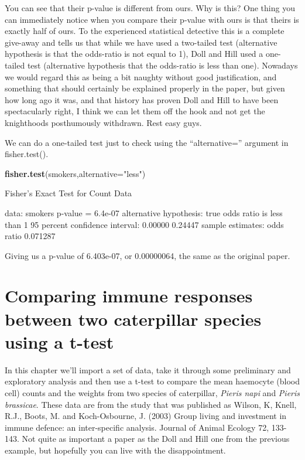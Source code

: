 \documentclass[
]{book}
\newenvironment{Shaded}{\begin{snugshade}}{\end{snugshade}}
\newcommand{\DataTypeTok}[1]{\textcolor[rgb]{0.13,0.29,0.53}{#1}}
\newcommand{\KeywordTok}[1]{\textcolor[rgb]{0.13,0.29,0.53}{\textbf{#1}}}
\newcommand{\NormalTok}[1]{#1}
\newcommand{\StringTok}[1]{\textcolor[rgb]{0.31,0.60,0.02}{#1}}
\begin{document}
You can see that their p-value is different from ours. Why is this? One thing you can immediately notice when you compare their p-value with ours is that theirs is exactly half of ours. To the experienced statistical detective this is a complete give-away and tells us that while we have used a two-tailed test (alternative hypothesis is that the odds-ratio is not equal to 1), Doll and Hill used a one-tailed test (alternative hypothesis that the odds-ratio is less than one). Nowadays we would regard this as being a bit naughty without good justification, and something that should certainly be explained properly in the paper, but given how long ago it was, and that history has proven Doll and Hill to have been spectacularly right, I think we can let them off the hook and not get the knighthoods posthumously withdrawn. Rest easy guys.

We can do a one-tailed test just to check using the ``alternative='' argument in fisher.test().

\begin{Shaded}
\begin{Highlighting}[]
\KeywordTok{fisher.test}\NormalTok{(smokers,}\DataTypeTok{alternative=}\StringTok{"less"}\NormalTok{)}

\NormalTok{    Fisher}\StringTok{'s Exact Test for Count Data}

\StringTok{data:  smokers}
\StringTok{p-value = 6.4e-07}
\StringTok{alternative hypothesis: true odds ratio is less than 1}
\StringTok{95 percent confidence interval:}
\StringTok{ 0.00000 0.24447}
\StringTok{sample estimates:}
\StringTok{odds ratio }
\StringTok{  0.071287 }
\end{Highlighting}
\end{Shaded}

Giving us a p-value of 6.403e-07, or 0.00000064, the same as the original paper.

\hypertarget{comparing-immune-responses-between-two-caterpillar-species-using-a-t-test}{%
\chapter{Comparing immune responses between two caterpillar species using a t-test}\label{comparing-immune-responses-between-two-caterpillar-species-using-a-t-test}}

In this chapter we'll import a set of data, take it through some preliminary and exploratory analysis and then use a t-test to compare the mean haemocyte (blood cell) counts and the weights from two species of caterpillar, \emph{Pieris napi} and \emph{Pieris brassicae}. These data are from the study that was published as Wilson, K, Knell, R.J., Boots, M. and Koch-Osbourne, J. (2003) Group living and investment in immune defence: an inter-specific analysis. Journal of Animal Ecology 72, 133-143. Not quite as important a paper as the Doll and Hill one from the previous example, but hopefully you can live with the disappointment.
\end{document}
